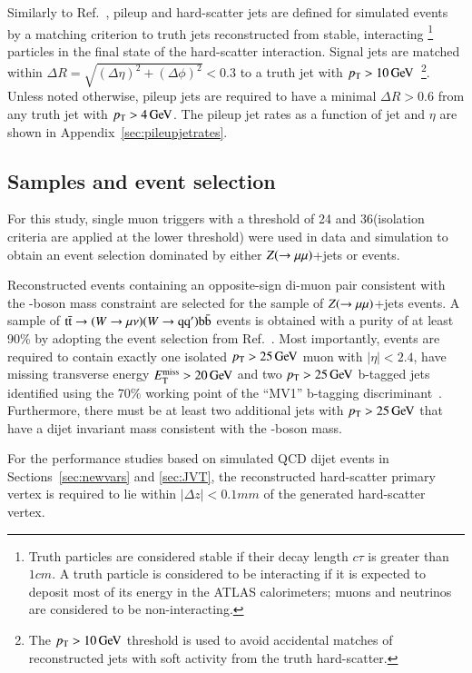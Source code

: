 \documentclass{atlasnote}
\begin{document}
Similarly to Ref.~\cite{ATLASConfNote:PUcorrection}, pileup and hard-scatter jets are defined 
for simulated events by a matching criterion to truth jets 
reconstructed from stable, interacting%
\footnote{
Truth particles are considered stable if their decay length $c \tau$ is greater than $1\unit{cm}$. 
A truth particle is considered to be interacting if it is expected to deposit most of its energy in the ATLAS calorimeters; muons and neutrinos are considered to be non-interacting.
}
particles in the final state of the hard-scatter interaction.
Signal
jets are matched within $\Delta R = \sqrt{(\Delta \eta)^2 + (\Delta \phi)^2}< 0.3$ to a truth jet with 
$p_{\mathrm{T}} > 10\,\text{Ge\hspace{-.08em}V}$~\footnote{The $p_{\mathrm{T}}>10\,\text{Ge\hspace{-.08em}V}$ threshold is used to avoid accidental matches of reconstructed jets with 
soft activity from the truth hard-scatter.}. Unless noted otherwise, pileup jets are required to have a minimal $\Delta R>0.6$
from any truth jet with $p_{\mathrm{T}} > 4\,\text{Ge\hspace{-.08em}V}$. The pileup jet rates as a function of jet \pT and $\eta$ are shown in Appendix~\ref{sec:pileupjetrates}. 


\subsection{Samples and event selection}
\label{sec:eventSel}
For this study, single muon triggers with a \pT threshold of 24 and 36\GeV (isolation criteria are applied at the lower threshold) were used in data and simulation to obtain an
event selection dominated by either $Z(\rightarrow\mu\mu)$+jets or \ttbar events. 

Reconstructed events containing an opposite-sign di-muon pair consistent with the \Zboson-boson mass constraint are selected for the sample of $Z(\rightarrow\mu\mu)$+jets events. 
A sample of ${\mathrm{t\bar{t}}}\rightarrow (W \rightarrow \mu \nu)(W \rightarrow {\mathrm{q}} {\mathrm{q}}^{\prime}){\mathrm{b}}{\mathrm{\bar{b}}}$ events is obtained with a purity of at least 90\% by adopting the event selection from Ref.~\cite{ATLAS-CONF-2013-086}.
Most importantly, events are required to contain exactly one isolated $p_{\mathrm{T}} > 25\,\text{Ge\hspace{-.08em}V}$ muon with $|\eta|<2.4$, have missing transverse energy $E_{\mathrm{T}}^{\mathrm{miss}} >20\,\text{Ge\hspace{-.08em}V}$ and
two $p_{\mathrm{T}} > 25\,\text{Ge\hspace{-.08em}V}$ b-tagged jets identified using the 70\% working point of the ``MV1'' b-tagging discriminant~\cite{ATLAS-CONF-2012-043}. Furthermore, there must be at least two additional jets with $p_{\mathrm{T}}>25\,\text{Ge\hspace{-.08em}V}$ that have 
a dijet invariant mass consistent with the \Wboson-boson mass. 

For the performance studies based on simulated QCD dijet events in Sections~\ref{sec:newvars} and \ref{sec:JVT}, the reconstructed hard-scatter primary vertex
is required to lie within $|\Delta z|<0.1\unit{mm}$ of the generated hard-scatter vertex. 
\end{document}
